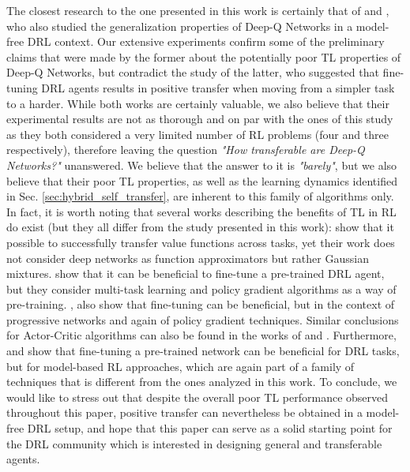The closest research to the one presented in this work is certainly that of \cite{farebrother2018generalization} and \cite{tyo2020transferable}, who also studied the generalization properties of Deep-Q Networks in a model-free DRL context. Our extensive experiments confirm some of the preliminary claims that were made by the former about the potentially poor TL properties of Deep-Q Networks, but contradict the study of the latter, who suggested that fine-tuning DRL agents results in positive transfer when moving from a simpler task to a harder. While both works are certainly valuable, we also believe that their experimental results are not as thorough and on par with the ones of this study as they both considered a very limited number of RL problems (four and three respectively), therefore leaving the question \textit{"How transferable are Deep-Q Networks?"} unanswered. We believe that the answer to it is \textit{"barely"}, but we also believe that their poor TL properties, as well as the learning dynamics identified in Sec. \ref{sec:hybrid_self_transfer}, are inherent to this family of algorithms only. In fact, it is worth noting that several works describing the benefits of TL in RL do exist (but they all differ from the study presented in this work): \cite{tirinzoni2018transfer} show that it possible to successfully transfer value functions across tasks, yet their work does not consider deep networks as function approximators but rather Gaussian mixtures. \cite{parisotto2015actor} show that it can be beneficial to fine-tune a pre-trained DRL agent, but they consider multi-task learning and policy gradient algorithms as a way of pre-training. \cite{rusu2016progressive}, also show that fine-tuning can be beneficial, but in the context of progressive networks and again of policy gradient techniques. Similar conclusions for Actor-Critic algorithms can also be found in the works of \cite{zhu2017target} and \cite{chen2021improving}. Furthermore, \cite{landolfi2019model} and \cite{sasso2021fractional} show that fine-tuning a pre-trained network can be beneficial for DRL tasks, but for model-based RL approaches, which are again part of a family of techniques that is different from the ones analyzed in this work. To conclude, we would like to stress out that despite the overall poor TL performance observed throughout this paper, positive transfer can nevertheless be obtained in a model-free DRL setup, and hope that this paper can serve as a solid starting point for the DRL community which is interested in designing general and transferable agents.  








